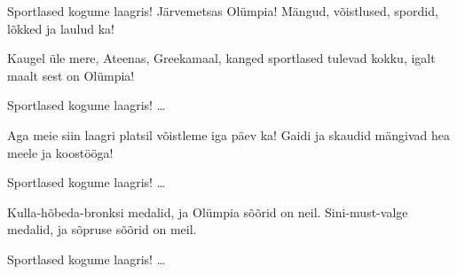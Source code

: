Sportlased kogume laagris!
J\"arvemetsas Ol\"umpia!
M\"angud, v\~oistlused, spordid,
l\~okked ja laulud ka!

Kaugel \"ule mere,
Ateenas, Greekamaal,
kanged sportlased tulevad kokku,
igalt maalt sest on Ol\"umpia!

Sportlased kogume laagris! \ldots

Aga meie siin laagri platsil
v\~oistleme iga p\"aev ka!
Gaidi ja skaudid m\"angivad
hea meele ja koost\"o\"oga!

Sportlased kogume laagris! \ldots

Kulla-h\~obeda-bronksi medalid,
ja Ol\"umpia s\~o\~orid on neil.
Sini-must-valge medalid,
ja s\~opruse s\~o\~orid on meil.

Sportlased kogume laagris! \ldots